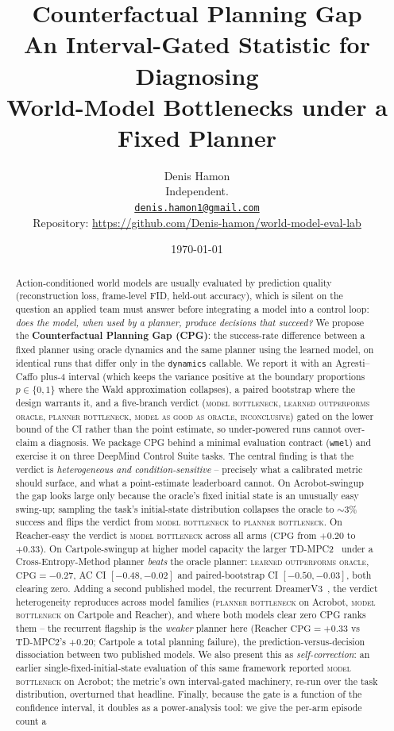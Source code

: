 \documentclass[10pt,letterpaper]{article}
\title{
  \textbf{Counterfactual Planning Gap}\\[0.3em]
  \large An Interval-Gated Statistic for Diagnosing\\
  World-Model Bottlenecks under a Fixed Planner
}
\author{
  Denis Hamon\\
  \small Independent.\\
  \small\href{mailto:denis.hamon1@gmail.com}{\texttt{denis.hamon1@gmail.com}}\\
  \small Repository: \url{https://github.com/Denis-hamon/world-model-eval-lab}
}
\date{\today}
\begin{document}
\maketitle

\begin{abstract}
\noindent Action-conditioned world models are usually evaluated by prediction quality (reconstruction loss, frame-level FID, held-out accuracy), which is silent on the question an applied team must answer before integrating a model into a control loop: \emph{does the model, when used by a planner, produce decisions that succeed?} We propose the \textbf{Counterfactual Planning Gap (CPG)}: the success-rate difference between a fixed planner using oracle dynamics and the same planner using the learned model, on identical runs that differ only in the \texttt{dynamics} callable. We report it with an Agresti--Caffo plus-4 interval (which keeps the variance positive at the boundary proportions $p \in \{0,1\}$ where the Wald approximation collapses), a paired bootstrap where the design warrants it, and a five-branch verdict (\textsc{model bottleneck}, \textsc{learned outperforms oracle}, \textsc{planner bottleneck}, \textsc{model as good as oracle}, \textsc{inconclusive}) gated on the lower bound of the CI rather than the point estimate, so under-powered runs cannot over-claim a diagnosis. We package CPG behind a minimal evaluation contract (\texttt{wmel}) and exercise it on three DeepMind Control Suite tasks. The central finding is that the verdict is \emph{heterogeneous and condition-sensitive} -- precisely what a calibrated metric should surface, and what a point-estimate leaderboard cannot. On Acrobot-swingup the gap looks large only because the oracle's fixed initial state is an unusually easy swing-up; sampling the task's initial-state distribution collapses the oracle to $\sim\!3\%$ success and flips the verdict from \textsc{model bottleneck} to \textsc{planner bottleneck}. On Reacher-easy the verdict is \textsc{model bottleneck} across all arms ($\mathrm{CPG}$ from $+0.20$ to $+0.33$). On Cartpole-swingup at higher model capacity the larger TD-MPC2~\citep{hansen2024tdmpc2} under a Cross-Entropy-Method planner \emph{beats} the oracle planner: \textsc{learned outperforms oracle}, $\mathrm{CPG} = -0.27$, AC CI $[-0.48, -0.02]$ and paired-bootstrap CI $[-0.50, -0.03]$, both clearing zero. Adding a second published model, the recurrent DreamerV3~\citep{hafner2023dreamerv3}, the verdict heterogeneity reproduces across model families (\textsc{planner bottleneck} on Acrobot, \textsc{model bottleneck} on Cartpole and Reacher), and where both models clear zero CPG ranks them -- the recurrent flagship is the \emph{weaker} planner here (Reacher $\mathrm{CPG} = +0.33$ vs TD-MPC2's $+0.20$; Cartpole a total planning failure), the prediction-versus-decision dissociation between two published models. We also present this as \emph{self-correction}: an earlier single-fixed-initial-state evaluation of this same framework reported \textsc{model bottleneck} on Acrobot; the metric's own interval-gated machinery, re-run over the task distribution, overturned that headline. Finally, because the gate is a function of the confidence interval, it doubles as a power-analysis tool: we give the per-arm episode count a 
\end{abstract}
\end{document}
